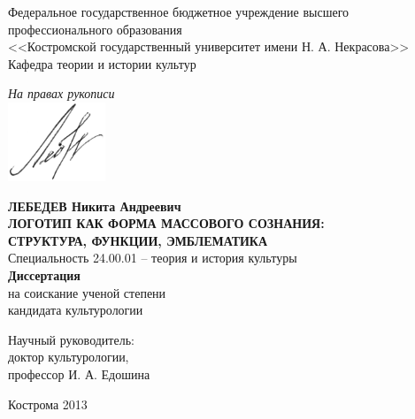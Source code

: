 \thispagestyle{empty}

\begin{center}
  Федеральное государственное бюджетное учреждение высшего профессионального образования \\
  <<Костромской государственный университет имени Н. А. Некрасова>> \\
  \vspace{1em}
  Кафедра теории и истории культур
\end{center}
\vspace{.1em}
\begin{flushright}
  \textit{На правах рукописи} \\
  \vspace{14pt}
  \includegraphics[width=2.9cm]{images/lebedev}
\end{flushright}
\begin{center}
  \textbf{ЛЕБЕДЕВ Никита Андреевич} \\
  \vspace{3em}
  \textbf{ЛОГОТИП КАК ФОРМА МАССОВОГО СОЗНАНИЯ:\\
    СТРУКТУРА, ФУНКЦИИ, ЭМБЛЕМАТИКА} \\
  \vspace{3em}
  Специальность 24.00.01 – теория и история культуры \\
  \vspace{3em}
  \textbf{Диссертация} \\
  на соискание ученой степени \\
  кандидата культурологии
\end{center}
\vspace{3em}
\begin{flushright}
  Научный руководитель: \\
  доктор культурологии, \\
  профессор И. А. Едошина
\end{flushright}

\vspace{6em}
\begin{center}
  Кострома 2013
\end{center}
